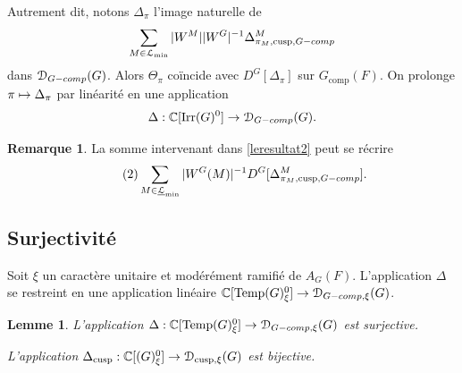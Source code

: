 \documentclass[11pt]{article}
\newcommand{\skpt}{\smallskip}
\numberwithin{equation}{section}\providecommand{\og}{«\,}\providecommand{\fg}{\,»}
\let\mathcal \EuScript
\let\oldenumerate\enumerate
\renewcommand{\enumerate}{\oldenumerate\itemindent0pt}
\newenvironment{enumeratei}
{\bgroup\def\theenumi{\roman{enumi}}\def\theenumii{\arabic{enumii}}\oldenumerate}
{\endenumerate\egroup}
\newcommand{\NoChangel}[1]{%
\expandafter\let\csname old\string#1\endcsname=#1
\let#1=\relax
\newcommand{#1}{\mathcode`l="716C\csname old\string#1\endcsname\mathcode`l="7160 }%
}
\newcommand\mto{\mathchoice{\longmapsto}{\mapsto}{\mapsto}{\mapsto}}
\newcommand{\comp}{\mathrm{comp}}
\newcommand{\tcomp}{\textup{-comp}}
\newcommand{\cusp}{\mathrm{cusp}}
\newcommand{\Ell}{\mathrm{Ell}} \NoChangel{\Ell}
\newcommand{\Irr}{\mathrm{Irr}}
\newcommand{\Temp}{\mathrm{Temp}}
\newcommand{\cD}{\mathcal{D}}
\newcommand{\cL}{\mathcal{L}}
\newcommand{\CC}{\mathbb{C}}
\theoremstyle{plain}
\newtheorem*{lem*}{Lemme}
\theoremstyle{definition}
\newtheorem*{rem*}{Remarque}
\begin{document}
Autrement dit, notons $\Delta_{\pi}$ l'image naturelle de
\[
\sum_{M\in \cL_{\min}}\vert W^M\vert \vert W^G\vert ^{-1}\Delta^M_{\pi_{M},\cusp,G\tcomp}
\]
dans $\cD_{G\tcomp}(G)$. Alors $\Theta_{\pi}$ coïncide avec $D^G[\Delta_{\pi}]$ sur $G_{\comp}(F)$. On prolonge $\pi\mto \Delta_{\pi}$ par linéarité en une application
\[
\Delta:\CC[\Irr(G)^0]\to \cD_{G\tcomp}(G).
\]

\begin{rem*}
La somme intervenant dans \eqref{leresultat2} peut se récrire
\begin{equation}\tag{2}\label{leresultat2}
\sum_{M\in \underline{\cL}_{\min}}\vert W^G(M)\vert ^{-1}D^G[\Delta^M_{\pi_{M},\cusp,G\tcomp}].
\end{equation}
\end{rem*}

\subsection{Surjectivité}\label{surjectivite}

Soit $\xi$ un caractère unitaire et modérément ramifié de $A_{G}(F)$. L'application $\Delta$ se restreint en une application linéaire $\CC[\Temp(G)_{\xi}^0]\to \cD_{G\tcomp,\xi}(G)$.

\skpt
\begin{lem*}
\begin{enumeratei}
\item\label{surjectivitei}
L'application $\Delta:\CC[\Temp(G)_{\xi}^0]\to \cD_{G\tcomp,\xi}(G)$ est surjective.

\item\label{surjectiviteii}
L'application $\Delta_{\cusp}:\CC[\Ell(G)_{\xi}^0]\to \cD_{\cusp,\xi}(G)$ est bijective.
\end{enumeratei}
\end{lem*}
\end{document}
